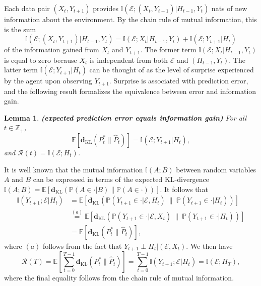 \documentclass[twoside,11pt]{article}
\renewenvironment{proof}{\par\noindent{\bf Proof\ }}{\hfill\BlackBox\\[2mm]}
\newenvironment{proof}{\par\noindent{\bf Proof\ }}{\hfill\BlackBox\\[2mm]}
\newtheorem{lemma}[theorem]{Lemma}
\def\environment{\mathcal{E}}
\def\regret{\mathcal{R}}
\def\KL{\mathbf{d}_{\mathrm{KL}}}
\def\E{\mathbb{E}}
\def\I{\mathbb{I}}
\def\Pr{\mathbb{P}}
\begin{document}
Each data pair $(X_t, Y_{t+1})$ provides $\I(\environment; (X_t, Y_{t+1}) | H_{t-1}, Y_t)$ nats of new information about the environment.  By the chain rule of mutual information, this is the sum
$$\I(\environment; (X_t, Y_{t+1}) | H_{t-1}, Y_t) = \I(\environment; X_t | H_{t-1}, Y_t) + \I(\environment; Y_{t+1} | H_t)$$ 
of the information gained from $X_t$ and $Y_{t+1}$.  The former term $\I(\environment; X_t | H_{t-1}, Y_t)$ is equal to zero because $X_t$ is independent from both $\environment$ and $(H_{t-1}, Y_t)$.  The latter term $\I(\environment; Y_{t+1} | H_t)$ can be thought of as the level of surprise experienced by the agent upon observing $Y_{t+1}$.  Surprise is associated with prediction error, and the following result formalizes the equivalence between error and information gain.
\begin{lemma}
    \label{le:error-and-environment-information}
    {\bf (expected prediction error equals information gain)}
    For all $t \in \mathbb{Z}_+$, 
    $$\E[\KL(P^*_t \| \hat{P}_t)] = \I(\environment; Y_{t+1} | H_t),$$
    and $\regret(t) = \I(\environment; H_t)$.
\end{lemma}
\begin{proof}
    It is well known that the mutual information $\I(A;B)$ between random variables $A$ and $B$ can be expressed in terms of the expected KL-divergence $\I(A; B) = \E[\KL(\Pr(A\in \cdot|B) \| \Pr(A \in \cdot))]$.  It follows that
    \begin{align*}
        \I(Y_{t+1}; \environment | H_t)
        & = \E[\KL(\Pr(Y_{t+1}\in\cdot | \environment, H_t) \ \| \ \Pr(Y_{t+1}\in\cdot | H_t))]\\
        & \overset{(a)}{=} \E[\KL(\Pr(Y_{t+1}\in\cdot | \environment, X_t) \ \| \ \Pr(Y_{t+1}\in\cdot | H_t))] \\
        & = \E[\KL(P^*_t \| \hat{P}_t)],
    \end{align*}
    where $(a)$ follows from the fact that $Y_{t+1}\perp H_t|(\environment, X_t)$. We then have
$$\regret(T)
= \E\left[\sum_{t=0}^{T-1} \KL(P^*_t \| \hat{P}_t)\right]
= \sum_{t=0}^{T-1} \I(Y_{t+1}; \environment | H_t)
= \I(\environment; H_T),$$
where the final equality follows from the chain rule of mutual information.
\end{proof}
\end{document}
